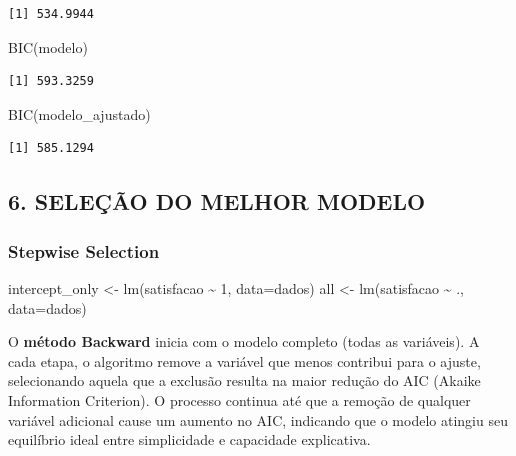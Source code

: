 \documentclass[
  letterpaper,
  DIV=11,
  numbers=noendperiod]{scrartcl}
\newenvironment{Shaded}{\begin{snugshade}}{\end{snugshade}}
\newcommand{\AttributeTok}[1]{\textcolor[rgb]{0.40,0.45,0.13}{#1}}
\newcommand{\DecValTok}[1]{\textcolor[rgb]{0.68,0.00,0.00}{#1}}
\newcommand{\FunctionTok}[1]{\textcolor[rgb]{0.28,0.35,0.67}{#1}}
\newcommand{\NormalTok}[1]{\textcolor[rgb]{0.00,0.23,0.31}{#1}}
\newcommand{\OtherTok}[1]{\textcolor[rgb]{0.00,0.23,0.31}{#1}}
\newcommand{\SpecialCharTok}[1]{\textcolor[rgb]{0.37,0.37,0.37}{#1}}
\begin{document}
\begin{verbatim}
[1] 534.9944
\end{verbatim}

\begin{Shaded}
\begin{Highlighting}[]
\FunctionTok{BIC}\NormalTok{(modelo)}
\end{Highlighting}
\end{Shaded}

\begin{verbatim}
[1] 593.3259
\end{verbatim}

\begin{Shaded}
\begin{Highlighting}[]
\FunctionTok{BIC}\NormalTok{(modelo\_ajustado)}
\end{Highlighting}
\end{Shaded}

\begin{verbatim}
[1] 585.1294
\end{verbatim}

\subsection{6. SELEÇÃO DO MELHOR
MODELO}\label{seleuxe7uxe3o-do-melhor-modelo}

\subsubsection{Stepwise Selection}\label{stepwise-selection}

\begin{Shaded}
\begin{Highlighting}[]
\NormalTok{intercept\_only }\OtherTok{\textless{}{-}} \FunctionTok{lm}\NormalTok{(satisfacao }\SpecialCharTok{\textasciitilde{}} \DecValTok{1}\NormalTok{, }\AttributeTok{data=}\NormalTok{dados)}
\NormalTok{all }\OtherTok{\textless{}{-}} \FunctionTok{lm}\NormalTok{(satisfacao }\SpecialCharTok{\textasciitilde{}}\NormalTok{ ., }\AttributeTok{data=}\NormalTok{dados)}
\end{Highlighting}
\end{Shaded}

O \textbf{método Backward} inicia com o modelo completo (todas as
variáveis). A cada etapa, o algoritmo remove a variável que menos
contribui para o ajuste, selecionando aquela que a exclusão resulta na
maior redução do AIC (Akaike Information Criterion). O processo continua
até que a remoção de qualquer variável adicional cause um aumento no
AIC, indicando que o modelo atingiu seu equilíbrio ideal entre
simplicidade e capacidade explicativa.
\end{document}
